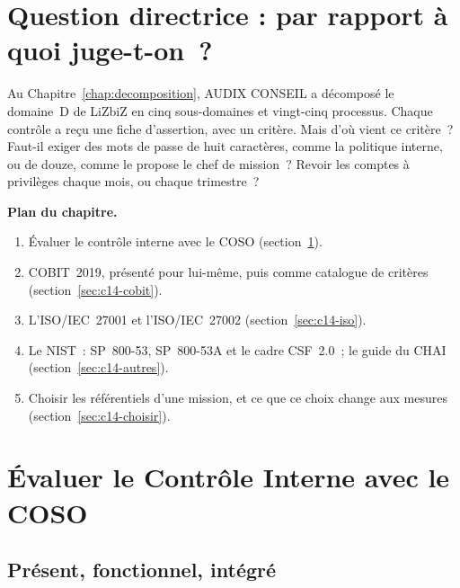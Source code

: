 \bigskip

\section*{Question directrice : par rapport à quoi juge-t-on~?}

Au Chapitre~\ref{chap:decomposition}, AUDIX CONSEIL a décomposé le domaine~D
de LiZbiZ en cinq sous-domaines et vingt-cinq processus. Chaque contrôle a
reçu une fiche d'assertion, avec un critère. Mais d'où vient ce critère~?
Faut-il exiger des mots de passe de huit caractères, comme la politique
interne, ou de douze, comme le propose le chef de mission~? Revoir les
comptes à privilèges chaque mois, ou chaque trimestre~?

\medskip
\textbf{Plan du chapitre.}
\begin{enumerate}
    \item Évaluer le contrôle interne avec le COSO (section~\ref{sec:c14-coso}).
    \item COBIT~2019, présenté pour lui-même, puis comme catalogue de critères (section~\ref{sec:c14-cobit}).
    \item L'ISO/IEC~27001 et l'ISO/IEC~27002 (section~\ref{sec:c14-iso}).
    \item Le NIST~: SP~800-53, SP~800-53A et le cadre CSF~2.0~; le guide du CHAI (section~\ref{sec:c14-autres}).
    \item Choisir les référentiels d'une mission, et ce que ce choix change aux mesures (section~\ref{sec:c14-choisir}).
\end{enumerate}

\separateur

\section{Évaluer le Contrôle Interne avec le COSO}
\label{sec:c14-coso}

\subsection{Présent, fonctionnel, intégré}

